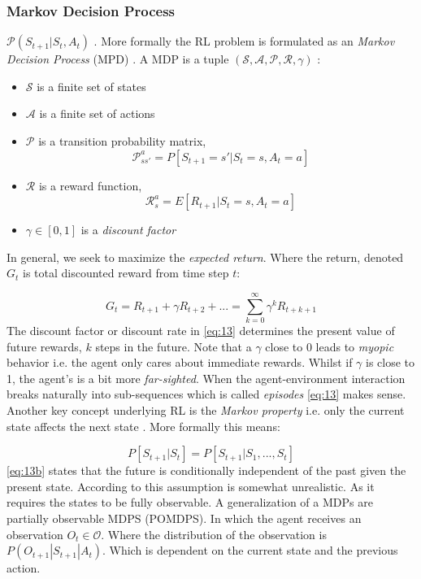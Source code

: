 \documentclass{kththesis}
\theoremstyle{definition}
\begin{document}
\subsubsection*{Markov Decision Process}
$\mathcal{P}(S_{t+1} |S_t, A_t)$ \parencite{li2017deep}. More formally the RL problem is formulated as an \textit{Markov Decision Process} (MPD) \parencite{sutton1998reinforcement, li2017deep}. A MDP is a tuple $(\mathcal{S, A, P, R}, \gamma)$ \parencite{li2017deep}:
\begin{itemize}
    \item $\mathcal{S}$ is a finite set of states
    \item $\mathcal{A}$ is a finite set of actions
    \item $\mathcal{P}$ is a transition probability matrix, 
    \begin{equation} 
        \label{eq:12a}
        \mathcal{P}^{a}_{ss'} = P[S_{t+1} = s' | S_t =s, A_t = a]
    \end{equation}
    \item $\mathcal{R}$ is a reward function, 
    \begin{equation}
        \label{eq:12b}
        \mathcal{R}^{a}_{s} = E[R_{t+1} | S_t =s, A_t=a]
    \end{equation}
    \item $\gamma \in [0,1]$ is a \textit{discount factor} 
\end{itemize}
In general, we seek to maximize the \textit{expected return}. Where the return, denoted $G_t$ is total discounted reward from time step $t$:

\begin{equation}
    \label{eq:13}
    G_t = R_{t+1} + \gamma R_{t+2} + ... = \sum_{k=0}^{\infty}{\gamma^{k}R_{t+k+1}}
\end{equation}
The discount factor or discount rate in \autoref{eq:13} determines the present value of future rewards, $k$ steps in the future. Note that a $\gamma$ close to 0 leads to \textit{myopic} behavior i.e. the agent only cares about immediate rewards. Whilst if $\gamma$ is close to 1, the agent's is a bit more \textit{far-sighted}. When the agent-environment interaction breaks naturally into sub-sequences which is called \textit{episodes}
\autoref{eq:13} makes sense.  Another key concept underlying RL is the \textit{Markov property} i.e. only the current state affects the next state \parencite{arulkumaran2017brief}. More formally this means:

\begin{equation}
    \label{eq:13b}
    P[S_{t+1} | S_t] = P[S_{t+1} | S_1, ..., S_t]
\end{equation}
\autoref{eq:13b} states that the future is conditionally independent of the past given the present state. According to \textcite{arulkumaran2017brief} this assumption is somewhat unrealistic. As it requires the states to be fully observable. A generalization of a MDPs are partially observable MDPS (POMDPS). In which the agent receives an observation $O_t \in \mathcal{O}$. Where the distribution of the observation is $P(O_{t+1} | S_{t+1} | A_t)$\parencite{arulkumaran2017brief}. Which is dependent on the current state and the previous action.
\end{document}

